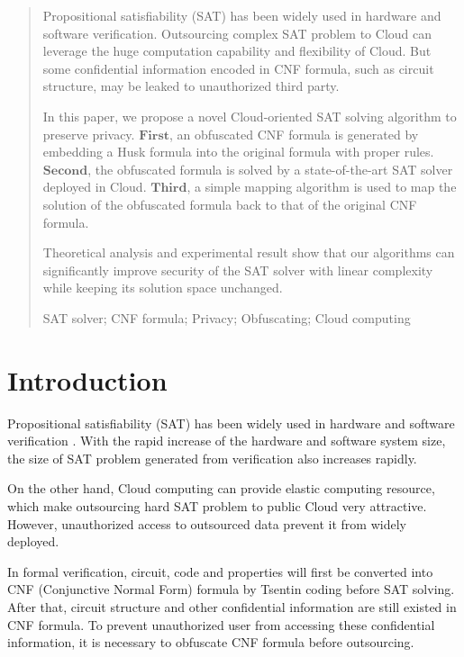 \documentclass[runningheads,a4paper]{llncs}
\newcommand{\keywords}[1]{\par\addvspace\baselineskip
\noindent\keywordname\enspace\ignorespaces#1}
\begin{document}
\begin{abstract}

Propositional satisfiability (SAT) has been widely used in hardware and software verification. 
Outsourcing complex SAT problem to Cloud can leverage the huge computation capability and flexibility of Cloud.
But some confidential information encoded in CNF formula, 
such as circuit structure, 
may be leaked to unauthorized third party.

In this paper, we propose a novel Cloud-oriented SAT solving algorithm to preserve privacy.
$\mathbf{First}$, an obfuscated CNF formula is generated by embedding a Husk formula into the original formula with proper rules.
$\mathbf{Second}$, the obfuscated formula is solved by a state-of-the-art SAT solver deployed in Cloud.
$\mathbf{Third}$, a simple mapping algorithm is used to map the solution 
of the obfuscated formula back to that of the original CNF formula. 

Theoretical analysis and experimental result show that our algorithms can significantly improve security of the SAT solver 
with linear complexity while keeping its solution space unchanged.


\keywords{SAT solver; CNF formula; Privacy; Obfuscating; Cloud computing}
\end{abstract}

\section{Introduction}
Propositional satisfiability \cite{t1} (SAT) has been widely used in hardware and software verification \cite{t2}\cite{t3}. 
With the rapid increase of the hardware and software system size,
the size of SAT problem generated from verification also increases rapidly. 

On the other hand, 
Cloud computing can provide elastic computing resource,
which make outsourcing hard SAT problem 
to public Cloud \cite{t35}\cite{t37} very attractive.
However,
unauthorized access to outsourced data prevent it from widely deployed. 

In formal verification, 
circuit, code and properties will first be converted into CNF (Conjunctive Normal Form) formula 
by Tsentin coding\cite{t4} before SAT solving. 
After that, 
circuit structure and other confidential information are still existed in CNF formula.
To prevent unauthorized user from accessing these confidential information, 
it is necessary to obfuscate CNF formula before outsourcing.
\end{document}
